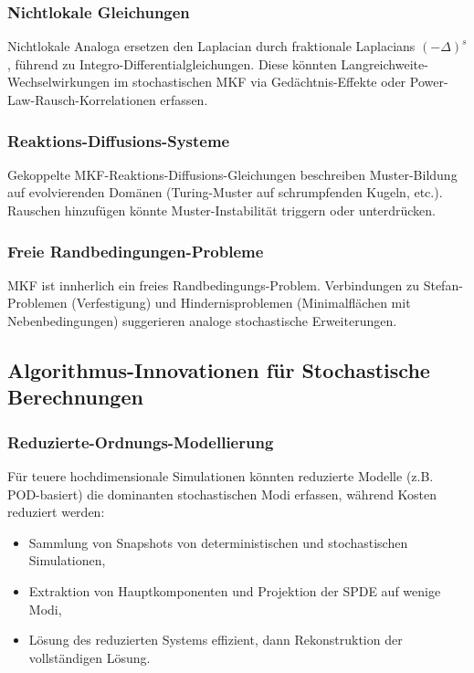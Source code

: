 \documentclass[a4paper,12pt]{article}
\theoremstyle{definition}
\begin{document}
\subsubsection{Nichtlokale Gleichungen}

Nichtlokale Analoga ersetzen den Laplacian durch fraktionale Laplacians $(-\Delta)^{s}$, führend zu Integro-Differentialgleichungen. Diese könnten Langreichweite-Wechselwirkungen im stochastischen MKF via Gedächtnis-Effekte oder Power-Law-Rausch-Korrelationen erfassen.

\subsubsection{Reaktions-Diffusions-Systeme}

Gekoppelte MKF-Reaktions-Diffusions-Gleichungen beschreiben Muster-Bildung auf evolvierenden Domänen (Turing-Muster auf schrumpfenden Kugeln, etc.). Rauschen hinzufügen könnte Muster-Instabilität triggern oder unterdrücken.

\subsubsection{Freie Randbedingungen-Probleme}

MKF ist innherlich ein freies Randbedingungs-Problem. Verbindungen zu Stefan-Problemen (Verfestigung) und Hindernisproblemen (Minimalflächen mit Nebenbedingungen) suggerieren analoge stochastische Erweiterungen.

\subsection{Algorithmus-Innovationen für Stochastische Berechnungen}

\subsubsection{Reduzierte-Ordnungs-Modellierung}

Für teuere hochdimensionale Simulationen könnten reduzierte Modelle (z.B. POD-basiert) die dominanten stochastischen Modi erfassen, während Kosten reduziert werden:

\begin{itemize}
	\item Sammlung von Snapshots von deterministischen und stochastischen Simulationen,
	\item Extraktion von Hauptkomponenten und Projektion der SPDE auf wenige Modi,
	\item Lösung des reduzierten Systems effizient, dann Rekonstruktion der vollständigen Lösung.
\end{itemize}
\end{document}
